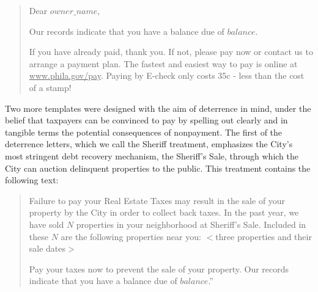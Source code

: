 \documentclass[12pt,titlepage]{article}
\begin{document}
\blockquote{
	Dear $owner\_name$,

	Our records indicate that you have a balance due of $balance$.

	If you have already paid, thank you. If not, please pay now or contact us
	to arrange a payment plan. The fastest and easiest way to pay is online at
	\underline{www.phila.gov/pay}. Paying by E-check only costs 35c - 
	less than the cost of a stamp!
}

Two more templates were designed with the aim of deterrence in mind, under 
the belief that taxpayers can be convinced to pay by spelling out clearly 
and in tangible terms the potential consequences of nonpayment. The first 
of the deterrence letters, which we call the \hypertarget{sheriff}{Sheriff}
treatment, emphasizes the City's most stringent debt recovery mechanism, 
the Sheriff's Sale, through which the City can auction delinquent properties 
to the public. This treatment contains the following text: 

\blockquote{
	Failure to pay your Real Estate Taxes may result in the sale of 
	your property by the City in order to collect back taxes. In the 
	past year, we have sold $N$ properties in your neighborhood at 
	Sheriff's Sale.	Included in these $N$ are the following properties 
	near you: $<$three properties and their sale dates$>$ 

	Pay your taxes now to prevent the sale of your property. 
	Our records indicate that you have a balance due of $balance$.”
}
\end{document}
